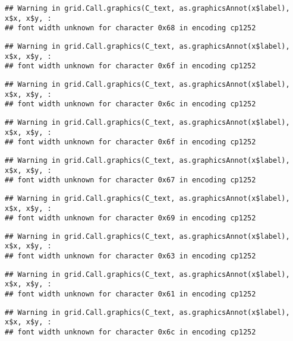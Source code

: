 \documentclass[
]{article}
\begin{document}
\begin{verbatim}
## Warning in grid.Call.graphics(C_text, as.graphicsAnnot(x$label), x$x, x$y, :
## font width unknown for character 0x68 in encoding cp1252
\end{verbatim}

\begin{verbatim}
## Warning in grid.Call.graphics(C_text, as.graphicsAnnot(x$label), x$x, x$y, :
## font width unknown for character 0x6f in encoding cp1252
\end{verbatim}

\begin{verbatim}
## Warning in grid.Call.graphics(C_text, as.graphicsAnnot(x$label), x$x, x$y, :
## font width unknown for character 0x6c in encoding cp1252
\end{verbatim}

\begin{verbatim}
## Warning in grid.Call.graphics(C_text, as.graphicsAnnot(x$label), x$x, x$y, :
## font width unknown for character 0x6f in encoding cp1252
\end{verbatim}

\begin{verbatim}
## Warning in grid.Call.graphics(C_text, as.graphicsAnnot(x$label), x$x, x$y, :
## font width unknown for character 0x67 in encoding cp1252
\end{verbatim}

\begin{verbatim}
## Warning in grid.Call.graphics(C_text, as.graphicsAnnot(x$label), x$x, x$y, :
## font width unknown for character 0x69 in encoding cp1252
\end{verbatim}

\begin{verbatim}
## Warning in grid.Call.graphics(C_text, as.graphicsAnnot(x$label), x$x, x$y, :
## font width unknown for character 0x63 in encoding cp1252
\end{verbatim}

\begin{verbatim}
## Warning in grid.Call.graphics(C_text, as.graphicsAnnot(x$label), x$x, x$y, :
## font width unknown for character 0x61 in encoding cp1252
\end{verbatim}

\begin{verbatim}
## Warning in grid.Call.graphics(C_text, as.graphicsAnnot(x$label), x$x, x$y, :
## font width unknown for character 0x6c in encoding cp1252
\end{verbatim}
\end{document}
